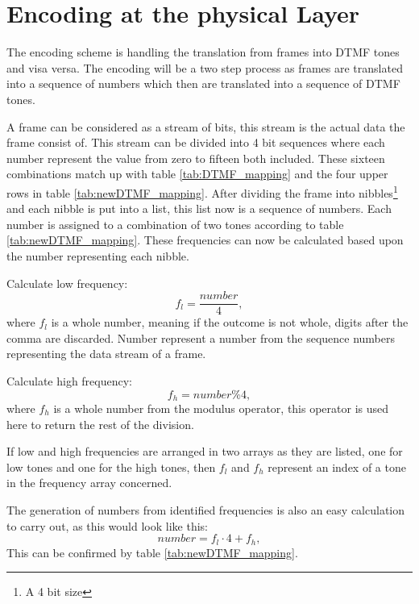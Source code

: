 \chapter{Encoding at the physical Layer}\label{app:physical_encode}

	
	
	
	
	
	The encoding scheme is handling the translation from frames into DTMF tones and visa versa. The encoding will be a
	two step process as frames are translated into a sequence of numbers which then are translated into a sequence of DTMF
	tones.
	
	A frame can be considered as a stream of bits, this stream is the actual data the frame consist of. This stream can be divided
	into 4 bit sequences where each number represent the value from zero to fifteen both included. These sixteen combinations
	match up with table \ref{tab:DTMF_mapping} and the four upper rows in table \ref{tab:newDTMF_mapping}. After dividing the 
	frame into nibbles\footnote{A 4 bit size} and each nibble is put into a list, this list now is a sequence of numbers. Each
	number is assigned to a combination of two tones according to table \ref{tab:newDTMF_mapping}. These frequencies can now be
	calculated based upon the number representing each nibble.
	
	Calculate low frequency:
	\begin{equation}f_{l} = \frac{number}{4},\end{equation}
	where $f_{l}$ is a whole number, meaning if the outcome is not whole, digits after the comma are discarded. Number
	represent a number from the sequence numbers representing the data stream of a frame.
	
	Calculate high frequency:
	\begin{equation}f_{h} = number\%4,\end{equation}
	where $f_{h}$ is a whole number from the modulus operator, this operator is used here to return the rest of the division.
	
	If low and high frequencies are arranged in two arrays as they are listed, one for low tones and one for the high tones,
	then $f_{l}$ and $f_{h}$ represent an index of a tone in the frequency array concerned.
	
	The generation of numbers from identified frequencies is also an easy calculation to carry out, as this would look like this:
	\begin{equation}number = f_{l} \cdot 4 + f_{h},\end{equation}
	This can be confirmed by table \ref{tab:newDTMF_mapping}.
	
